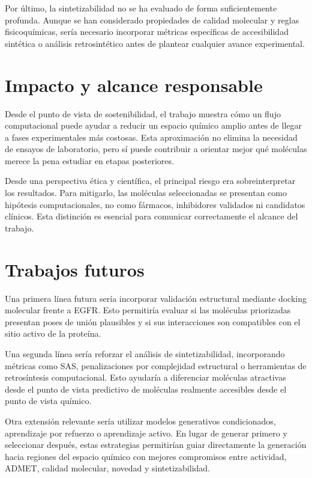 \documentclass[IB]{TFUOC}%
\begin{document}
Por último, la sintetizabilidad no se ha evaluado de forma suficientemente profunda. Aunque se han considerado propiedades de calidad molecular y reglas fisicoquímicas, sería necesario incorporar métricas específicas de accesibilidad sintética o análisis retrosintético antes de plantear cualquier avance experimental.

\section{Impacto y alcance responsable}

Desde el punto de vista de sostenibilidad, el trabajo muestra cómo un flujo computacional puede ayudar a reducir un espacio químico amplio antes de llegar a fases experimentales más costosas. Esta aproximación no elimina la necesidad de ensayos de laboratorio, pero sí puede contribuir a orientar mejor qué moléculas merece la pena estudiar en etapas posteriores.

Desde una perspectiva ética y científica, el principal riesgo era sobreinterpretar los resultados. Para mitigarlo, las moléculas seleccionadas se presentan como hipótesis computacionales, no como fármacos, inhibidores validados ni candidatos clínicos. Esta distinción es esencial para comunicar correctamente el alcance del trabajo.

\section{Trabajos futuros}

Una primera línea futura sería incorporar validación estructural mediante docking molecular frente a EGFR. Esto permitiría evaluar si las moléculas priorizadas presentan poses de unión plausibles y si sus interacciones son compatibles con el sitio activo de la proteína.

Una segunda línea sería reforzar el análisis de sintetizabilidad, incorporando métricas como SAS, penalizaciones por complejidad estructural o herramientas de retrosíntesis computacional. Esto ayudaría a diferenciar moléculas atractivas desde el punto de vista predictivo de moléculas realmente accesibles desde el punto de vista químico.

Otra extensión relevante sería utilizar modelos generativos condicionados, aprendizaje por refuerzo o aprendizaje activo. En lugar de generar primero y seleccionar después, estas estrategias permitirían guiar directamente la generación hacia regiones del espacio químico con mejores compromisos entre actividad, ADMET, calidad molecular, novedad y sintetizabilidad.
\end{document}
